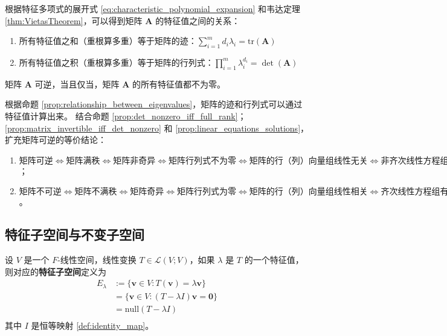 \vspace{0.5em}

\begin{proposition}[特征值之间的关系]
    根据特征多项式的展开式 \ref{eq:characteristic_polynomial_expansion} 和韦达定理 \ref{thm:VietasTheorem}，可以得到矩阵 $\mathbf{A}$ 的特征值之间的关系：
    \begin{enumerate}
        \item 所有特征值之和（重根算多重）等于矩阵的迹：$\sum_{i=1}^{m} d_i \lambda_i = \mathrm{tr}(\mathbf{A})$
        \item 所有特征值之积（重根算多重）等于矩阵的行列式：$\prod_{i=1}^{m} \lambda_i^{d_i} = \det(\mathbf{A})$
    \end{enumerate}
    \label{prop:relationship_between_eigenvalues}
\end{proposition}

\begin{corollary}
    矩阵 $\mathbf{A}$ 可逆，当且仅当，矩阵 $\mathbf{A}$ 的所有特征值都不为零。
\end{corollary}

\begin{note}
    根据命题 \ref{prop:relationship_between_eigenvalues}，矩阵的迹和行列式可以通过特征值计算出来。
    结合命题 \ref{prop:det_nonzero_iff_full_rank}；\ref{prop:matrix_invertible_iff_det_nonzero} 和 \ref{prop:linear_equations_solutions}，扩充矩阵可逆的等价结论：
    \begin{enumerate}
        \item $\text{矩阵可逆}\iff \text{矩阵满秩}\iff\text{矩阵非奇异}\iff\text{矩阵行列式不为零}\iff\text{矩阵的行（列）向量组线性无关}\iff \text{非齐次线性方程组有唯一非零解}\iff \text{所有特征值都不为零}$ ；
        \item $\text{矩阵不可逆} \iff \text{矩阵不满秩} \iff \text{矩阵奇异} \iff \text{矩阵行列式为零} \iff \text{矩阵的行（列）向量组线性相关}\iff \text{齐次线性方程组有存在非零解} \iff \text{存在特征值为零}$。
    \end{enumerate}
\end{note}

\vspace{1em}

\subsection{特征子空间与不变子空间}

\begin{definition}
    设 $V$ 是一个 $F$-线性空间，线性变换 $T\in \mathcal{L}(V;V)$，如果 $\lambda$ 是 $T$ 的一个特征值，则对应的\textbf{特征子空间}定义为
    \begin{align*}
        E_\lambda &:= \{\mathbf{v}\in V : T(\mathbf{v}) = \lambda \mathbf{v}\}\\
        &= \{\mathbf{v}\in V : (T - \lambda I) \mathbf{v}= \mathbf{0}\}\\
        &=\mathrm{null}(T - \lambda I)\\
    \end{align*}
    其中 $I$ 是恒等映射 \ref{def:identity_map}。
    \label{def:eigenspace}
\end{definition}


